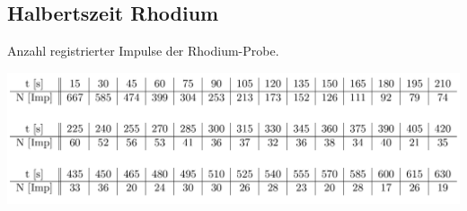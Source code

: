 \subsection{Halbertszeit Rhodium}
\begin{table}
\centering
\caption{Anzahl registrierter Impulse der Rhodium-Probe.}
\includegraphics[width=\textwidth]{data/Rhodium.png}
\label{tab:R}
\end{table}


%
